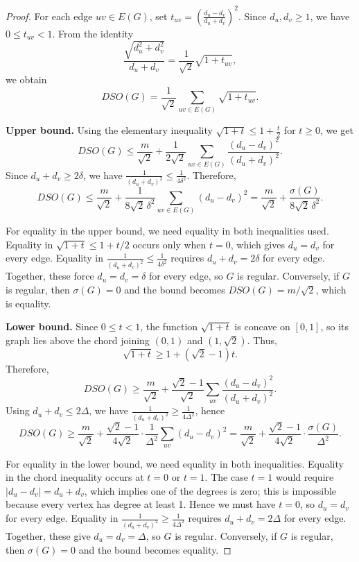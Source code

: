 \documentclass{article}
\theoremstyle{definition}
\begin{document}
\begin{proof}
For each edge $uv\in E(G)$, set
$
t_{uv} = \left(\frac{d_u-d_v}{d_u+d_v}\right)^2.
$
Since $d_u,d_v\ge 1$, we have $0 \le t_{uv} < 1$. From the identity
\[
\frac{\sqrt{d_u^2+d_v^2}}{d_u+d_v}
= \frac{1}{\sqrt{2}}\sqrt{1+t_{uv}},
\]
we obtain
\[
DSO(G) = \frac{1}{\sqrt{2}} \sum_{uv\in E(G)} \sqrt{1+t_{uv}}.
\]

\medskip
\noindent \textbf{Upper bound.}  
Using the elementary inequality $\sqrt{1+t} \le 1+\frac{t}{2}$ for $t\ge 0$, we get
\[
DSO(G) \le \frac{m}{\sqrt{2}} + \frac{1}{2\sqrt{2}} \sum_{uv\in E(G)} \frac{(d_u-d_v)^2}{(d_u+d_v)^2}.
\]
Since $d_u+d_v \ge 2\delta$, we have $\frac{1}{(d_u+d_v)^2} \le \frac{1}{4\delta^2}$. Therefore,
\[
DSO(G) \le \frac{m}{\sqrt{2}} + \frac{1}{8\sqrt{2}\,\delta^2} \sum_{uv\in E(G)} (d_u-d_v)^2
= \frac{m}{\sqrt{2}} + \frac{\sigma(G)}{8\sqrt{2}\,\delta^2}.
\]

For equality in the upper bound, we need equality in both inequalities used. Equality in $\sqrt{1+t} \le 1+t/2$ occurs only when $t=0$, which gives $d_u=d_v$ for every edge. Equality in $\frac{1}{(d_u+d_v)^2} \le \frac{1}{4\delta^2}$ requires $d_u+d_v=2\delta$ for every edge. Together, these force $d_u=d_v=\delta$ for every edge, so $G$ is regular. Conversely, if $G$ is regular, then $\sigma(G)=0$ and the bound becomes $DSO(G)=m/\sqrt{2}$, which is equality.

\medskip
\noindent \textbf{Lower bound.}  
Since $0 \le t < 1$, the function $\sqrt{1+t}$ is concave on $[0,1]$, so its graph lies above the chord joining $(0,1)$ and $(1,\sqrt{2})$. Thus,
\[
\sqrt{1+t} \ge 1 + (\sqrt{2}-1)t.
\]
Therefore,
\[
DSO(G) \ge \frac{m}{\sqrt{2}} + \frac{\sqrt{2}-1}{\sqrt{2}} \sum_{uv} \frac{(d_u-d_v)^2}{(d_u+d_v)^2}.
\]
Using $d_u+d_v \le 2\Delta$, we have $\frac{1}{(d_u+d_v)^2} \ge \frac{1}{4\Delta^2}$, hence
\[
DSO(G) \ge \frac{m}{\sqrt{2}} + \frac{\sqrt{2}-1}{4\sqrt{2}} \cdot \frac{1}{\Delta^2} \sum_{uv} (d_u-d_v)^2
= \frac{m}{\sqrt{2}} + \frac{\sqrt{2}-1}{4\sqrt{2}} \cdot \frac{\sigma(G)}{\Delta^2}.
\]

For equality in the lower bound, we need equality in both inequalities. Equality in the chord inequality occurs at $t=0$ or $t=1$. The case $t=1$ would require $|d_u-d_v|=d_u+d_v$, which implies one of the degrees is zero; this is impossible because every vertex has degree at least 1. Hence we must have $t=0$, so $d_u=d_v$ for every edge. Equality in $\frac{1}{(d_u+d_v)^2} \ge \frac{1}{4\Delta^2}$ requires $d_u+d_v=2\Delta$ for every edge. Together, these give $d_u=d_v=\Delta$, so $G$ is regular. Conversely, if $G$ is regular, then $\sigma(G)=0$ and the bound becomes equality.
\end{proof}
\end{document}

